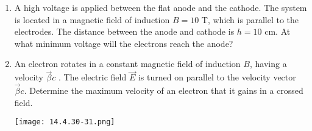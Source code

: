 \documentclass{article}
\begin{document}
\begin{enumerate}[label=14.4.\arabic*]
\item A high voltage is applied between the flat anode and the cathode. The system is located in a magnetic field of induction $B = 10$ T, which is parallel to the electrodes. The distance between the anode and cathode is $h = 10$ cm. At what minimum voltage will the electrons reach the anode?

\item An electron rotates in a constant magnetic field of induction $B$, having a velocity $\overrightarrow{\beta} c$ . The electric field $\overrightarrow{E}$ is turned on parallel to the velocity vector $\overrightarrow{\beta} c$. Determine the maximum velocity of an electron that it gains in a crossed field.

\begin{center}
    \texttt{[image: 14.4.30-31.png]}
\end{center}



\end{enumerate}
\end{document}
